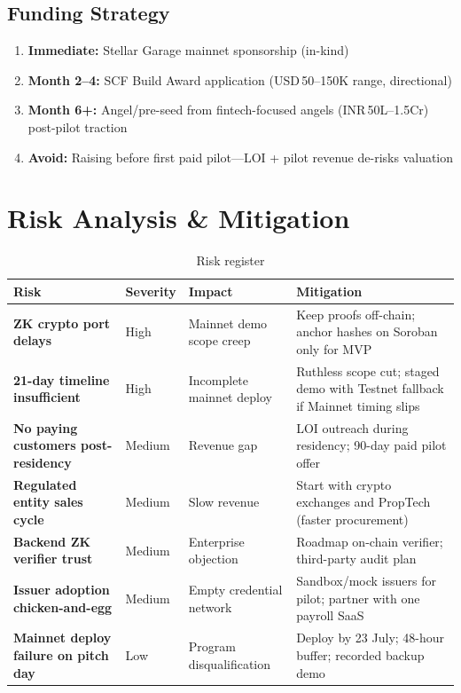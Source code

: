 \documentclass[11pt,a4paper]{article}
\newcommand{\stellar}{\textsf{Stellar}}
\newcommand{\soroban}{\textsf{Soroban}}
\begin{document}
\subsection{Funding Strategy}

\begin{enumerate}
  \item \textbf{Immediate:} \stellar{} Garage mainnet sponsorship (in-kind)
  \item \textbf{Month 2--4:} SCF Build Award application (USD\,50--150K range, directional)
  \item \textbf{Month 6+:} Angel/pre-seed from fintech-focused angels (INR\,50L--1.5Cr) post-pilot traction
  \item \textbf{Avoid:} Raising before first paid pilot---LOI + pilot revenue de-risks valuation
\end{enumerate}

\section{Risk Analysis \& Mitigation}

\begin{table}[H]
  \centering
  \caption{Risk register}
  \renewcommand{\arraystretch}{1.25}
  \small
  \begin{tabularx}{\textwidth}{@{}>{\bfseries}p{2.5cm} p{1.2cm} X X@{}}
    \toprule
    Risk & Severity & Impact & Mitigation \\
    \midrule
    ZK crypto port delays & High &
    Mainnet demo scope creep &
    Keep proofs off-chain; anchor hashes on \soroban{} only for MVP \\

    21-day timeline insufficient & High &
    Incomplete mainnet deploy &
    Ruthless scope cut; staged demo with Testnet fallback if Mainnet timing slips \\

    No paying customers post-residency & Medium &
    Revenue gap &
    LOI outreach during residency; 90-day paid pilot offer \\

    Regulated entity sales cycle & Medium &
    Slow revenue &
    Start with crypto exchanges and PropTech (faster procurement) \\

    Backend ZK verifier trust & Medium &
    Enterprise objection &
    Roadmap on-chain verifier; third-party audit plan \\

    Issuer adoption chicken-and-egg & Medium &
    Empty credential network &
    Sandbox/mock issuers for pilot; partner with one payroll SaaS \\

    Mainnet deploy failure on pitch day & Low &
    Program disqualification &
    Deploy by 23 July; 48-hour buffer; recorded backup demo \\
    \bottomrule
  \end{tabularx}
\end{table}
\end{document}
